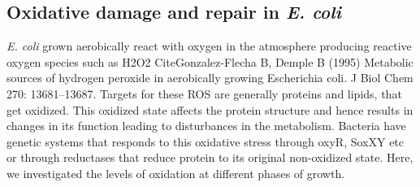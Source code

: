 \documentclass[12pt]{article}
\begin{document}
\subsection{Oxidative damage and repair in \emph{E. coli}}
%
%   
%   
%   
%

\emph{E. coli} grown aerobically react with oxygen in the atmosphere producing reactive oxygen species such as H2O2 {CiteGonzalez-Flecha B, Demple B (1995) Metabolic sources of hydrogen peroxide in aerobically growing Escherichia coli. J Biol Chem 270: 13681–13687}. Targets for these ROS are generally proteins and lipids, that get oxidized. This oxidized state affects the protein structure and hence results in changes in its function leading to disturbances in the metabolism. Bacteria have genetic systems that responds to this oxidative stress through oxyR, SoxXY etc or through reductases that reduce protein to its original non-oxidized state. Here, we investigated the levels of oxidation at different phases of growth.
\end{document}
